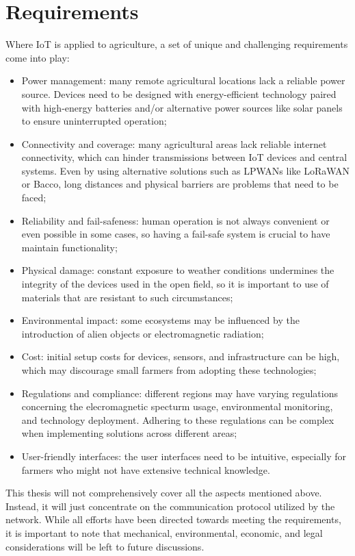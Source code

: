 \section{Requirements}
Where \gls{IoT} is applied to agriculture, a set of unique and challenging requirements come into play:
\begin{itemize}
    \item Power management: many remote agricultural locations lack a reliable power source. Devices need to be
        designed with energy-efficient technology paired with high-energy batteries and/or alternative power sources like solar
        panels to ensure uninterrupted operation;
    \item Connectivity and coverage: many agricultural areas lack reliable internet connectivity, which can hinder
        transmissions between IoT devices and central systems. Even by using alternative solutions such as \glspl{LPWAN}
        like LoRaWAN or Bacco, long distances and physical barriers are problems that need to be faced;
    \item Reliability and fail-safeness: human operation is not always convenient or even possible in
        some cases, so having a fail-safe system is crucial to have maintain functionality;
    \item Physical damage: constant exposure to weather conditions undermines the integrity of the devices used in the
        open field, so it is important to use of materials that are resistant to such circumstances;
    \item Environmental impact: some ecosystems may be influenced by the introduction of alien objects or
        electromagnetic radiation;
    \item Cost: initial setup costs for devices, sensors, and infrastructure can be high, which may discourage small
        farmers from adopting these technologies;
    \item Regulations and compliance: different regions may have varying regulations concerning the elecromagnetic
        specturm usage, environmental monitoring, and technology deployment. Adhering to these regulations can be complex when
        implementing solutions across different areas;
    \item User-friendly interfaces: the user interfaces need to be intuitive, especially for farmers who might not
        have extensive technical knowledge.
\end{itemize}
This thesis will not comprehensively cover all the aspects mentioned above. Instead, it will just concentrate on the
communication protocol utilized by the network. While all efforts have been directed towards meeting the requirements,
it is important to note that mechanical, environmental, economic, and legal considerations will be left to future
discussions.

